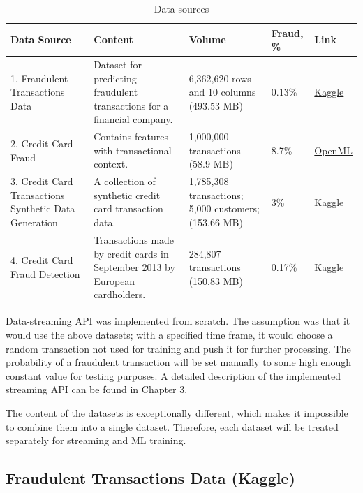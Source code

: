 \documentclass[12pt,a4paper, hidelinks]{article}
\begin{document}
\begin{table}[h!]
\centering


\begin{tabular}{|p{4.8cm}|p{3.5cm}|p{2cm}|p{2cm}|p{1.5cm}|}
\hline
\textbf{Data Source} & \textbf{Content} & \textbf{Volume} &  \textbf{Fraud, \%} & \textbf{Link} \\
\hline
1. Fraudulent Transactions Data &  Dataset for predicting fraudulent transactions for a financial company. &  6,362,620 rows and 10 columns (493.53 MB) & 0.13\% & \href{https://www.kaggle.com/datasets/chitwanmanchanda/fraudulent-transactions-data}{Kaggle} \\
\hline
2. Credit Card Fraud & Contains features with transactional context. & 1,000,000 transactions (58.9 MB) & 8.7\% & \href{https://www.openml.org/search?type=data\&status=active\&id=45955}{OpenML} \\
\hline
3. Credit Card Transactions Synthetic Data Generation & A collection of synthetic credit card transaction data. & 1,785,308 transactions; 5,000 customers; (153.66 MB) & 3\% & \href{https://www.kaggle.com/datasets/cgrodrigues/credit-card-transactions-synthetic-data-generation?select=transactions_df.csv}{Kaggle} \\
\hline
4. Credit Card Fraud Detection & Transactions made by credit cards in September 2013 by European cardholders. & 284,807 transactions (150.83 MB) & 0.17\% & \href{https://www.kaggle.com/datasets/mlg-ulb/creditcardfraud}{Kaggle} \\
\hline
\end{tabular}

\caption{Data sources}
\end{table}

Data-streaming API was implemented from scratch. The assumption was that it would use the above datasets; with a specified time frame, it would choose a random transaction not used for training and push it for further processing. The probability of a fraudulent transaction will be set manually to some high enough constant value for testing purposes. A detailed description of the implemented streaming API can be found in Chapter 3.

The content of the datasets is exceptionally different, which makes it impossible to combine them into a single dataset. Therefore, each dataset will be treated separately for streaming and ML training.


\subsection{Fraudulent Transactions Data (Kaggle)}
\end{document}

